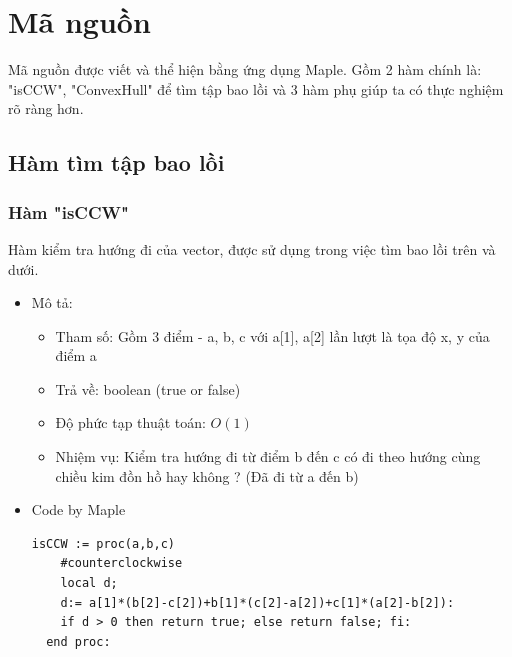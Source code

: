 \documentclass[12pt]{article}
\begin{document}
    \section{Mã nguồn}
      Mã nguồn được viết và thể hiện bằng ứng dụng Maple. Gồm 2 hàm chính là: "isCCW", "ConvexHull" để tìm tập bao lồi và 3 hàm phụ giúp ta có thực nghiệm rõ ràng hơn.
      \subsection{Hàm tìm tập bao lồi }
      \subsubsection{Hàm "isCCW"}
        Hàm kiểm tra hướng đi của vector, được sử dụng trong việc tìm bao lồi trên và dưới.
        \begin{itemize}
          \item Mô tả:
          \begin{itemize}
            \item Tham số: Gồm 3 điểm - a, b, c với a[1], a[2] lần lượt là tọa độ x, y của điểm a 
            \item Trả về: boolean (true or false)
            \item Độ phức tạp thuật toán: $O(1)$
            \item Nhiệm vụ: Kiểm tra hướng đi từ điểm b đến c có đi theo hướng cùng chiều kim đồn hồ hay không ? (Đã đi từ a đến b)
          \end{itemize}
        \item Code by Maple 
        \begin{Verbatim}[frame=single]
  isCCW := proc(a,b,c)
    #counterclockwise
    local d;
    d:= a[1]*(b[2]-c[2])+b[1]*(c[2]-a[2])+c[1]*(a[2]-b[2]):
    if d > 0 then return true; else return false; fi:
  end proc:
        \end{Verbatim}
      \end{itemize}
        \newpage
\end{document}
